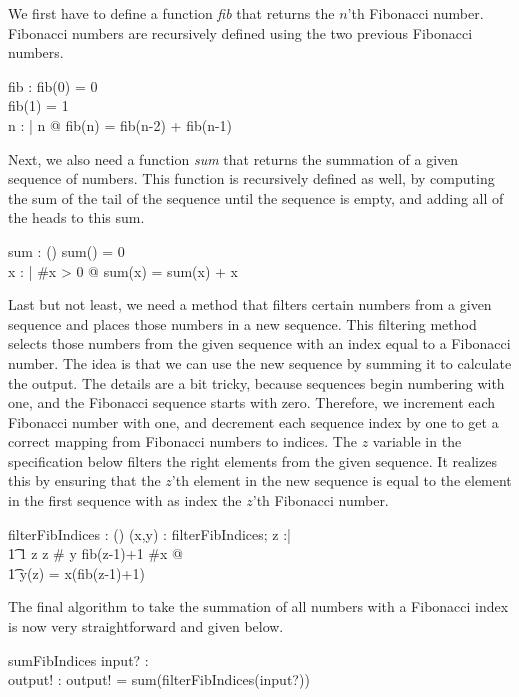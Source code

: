 \documentclass[12pt]{article}
\begin{document}
We first have to define a function  \textit{fib} that returns the $n$'th Fibonacci number. Fibonacci numbers are recursively defined using the two previous Fibonacci numbers.
\begin{axdef}
fib : \nat \fun \nat
\where
fib(0) = 0 \\
fib(1) = 1 \\
\forall n : \nat | n  @ fib(n) = fib(n-2) + fib(n-1)
\end{axdef}

Next, we also need a function \textit{sum} that returns the summation of a given sequence of numbers. This function is recursively defined as well, by computing the sum of the tail of the sequence until the sequence is empty, and adding all of the heads to this sum.
\begin{axdef}
sum : \power (\seq \real \fun \real)
\where
sum(\langle\rangle) = 0 \\
\forall x : \seq \real | \#x > 0 @ sum(x) = sum(\tail x) + \head x
\end{axdef}

Last but not least, we need a method that filters certain numbers from a given sequence and places those numbers in a new sequence. This filtering method selects those numbers from the given sequence with an index equal to a Fibonacci number. The idea is that we can use the new sequence by summing it to calculate the output. The details are a bit tricky, because sequences begin numbering with one, and the Fibonacci sequence starts with zero. Therefore, we increment each Fibonacci number with one, and decrement each sequence index by one to get a correct mapping from Fibonacci numbers to indices. The $z$ variable in the specification below filters the right elements from the given sequence. It realizes this by ensuring that the $z$'th element in the new sequence is equal to the element in the first sequence with as index the $z$'th Fibonacci number.
\begin{axdef}
filterFibIndices : \power (\seq \real \fun \seq \real)
\where
\forall (x,y) : filterFibIndices; z :\nat | \\
\t1 1 \leq z \wedge z \leq \# y \wedge fib(z-1)+1 \leq \#x @ \\
\t1 y(z) = x(fib(z-1)+1)
\end{axdef}

The final algorithm to take the summation of all numbers with a Fibonacci index is now very straightforward and given below.
\begin{schema}{sumFibIndices}
input? : \seq \real \\
output! : \real
\where
output! = sum(filterFibIndices(input?))
\end{schema}
\end{document}
